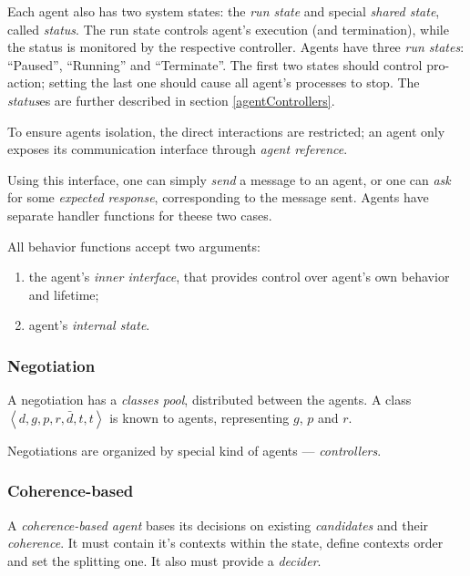 Each agent also has two system states: the \emph{run state} and special \emph{shared
  state}, called \emph{status}. The run state controls agent's execution
(and termination), while the status is monitored by the respective controller.
Agents have three \emph{run states}: ``Paused'', ``Running'' and ``Terminate''.
The first two states should control pro-action;
setting the last one should cause all agent's processes to stop.
The \emph{status}es are further described in section \ref{agentControllers}.

\medskip

To ensure agents isolation, the direct interactions are restricted;
an agent only exposes its communication interface through \emph{agent reference}.

Using this interface, one can simply \emph{send} a message to an agent,
or one can \emph{ask} for some \emph{expected response}, corresponding to the message sent.
Agents have separate handler functions for theese two cases.

\medskip

All behavior functions
accept two arguments:
\begin{enumerate}
\item the agent's \emph{inner interface}, that provides
  control over agent's own behavior and lifetime;
\item agent's \emph{internal state}.
\end{enumerate}

\subsubsection{Negotiation}


A negotiation has a \emph{classes pool}, distributed between the agents.
A class $\left< d, g, p, r, \bar d, t, t \right>$ is known to agents,
representing $g$, $p$ and $r$.

Negotiations are organized by special kind of agents --- \emph{controllers}.



\subsubsection{Coherence-based}


A \emph{coherence-based agent} bases its decisions on existing \emph{candidates}
and their \emph{coherence}. It must contain it's contexts within the state,
define contexts order and set the splitting one. It also must provide a
\emph{decider}.
\medskip

